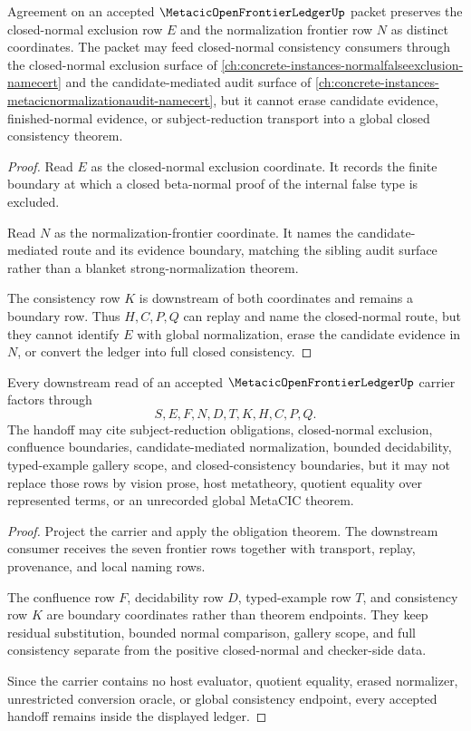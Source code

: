 \begin{theorem}
\label{thm:metacic-open-frontier-ledger-normalization-boundary}
Agreement on an accepted $\MetacicOpenFrontierLedgerUp$ packet preserves the closed-normal exclusion row $E$ and the normalization frontier row $N$ as distinct coordinates. The packet may feed closed-normal consistency consumers through the closed-normal exclusion surface of \autoref{ch:concrete-instances-normalfalseexclusion-namecert} and the candidate-mediated audit surface of \autoref{ch:concrete-instances-metacicnormalizationaudit-namecert}, but it cannot erase candidate evidence, finished-normal evidence, or subject-reduction transport into a global closed consistency theorem.
\end{theorem}
\begin{proof}
Read $E$ as the closed-normal exclusion coordinate. It records the finite boundary at which a closed beta-normal proof of the internal false type is excluded.

Read $N$ as the normalization-frontier coordinate. It names the candidate-mediated route and its evidence boundary, matching the sibling audit surface rather than a blanket strong-normalization theorem.

The consistency row $K$ is downstream of both coordinates and remains a boundary row. Thus $H,C,P,Q$ can replay and name the closed-normal route, but they cannot identify $E$ with global normalization, erase the candidate evidence in $N$, or convert the ledger into full closed consistency.
\end{proof}

\begin{theorem}
\label{thm:metacic-open-frontier-ledger-downstream-handoff}
Every downstream read of an accepted $\MetacicOpenFrontierLedgerUp$ carrier factors through
$$
S,E,F,N,D,T,K,H,C,P,Q.
$$
The handoff may cite subject-reduction obligations, closed-normal exclusion, confluence boundaries, candidate-mediated normalization, bounded decidability, typed-example gallery scope, and closed-consistency boundaries, but it may not replace those rows by vision prose, host metatheory, quotient equality over represented terms, or an unrecorded global MetaCIC theorem.
\end{theorem}
\begin{proof}
Project the carrier and apply the obligation theorem. The downstream consumer receives the seven frontier rows together with transport, replay, provenance, and local naming rows.

The confluence row $F$, decidability row $D$, typed-example row $T$, and consistency row $K$ are boundary coordinates rather than theorem endpoints. They keep residual substitution, bounded normal comparison, gallery scope, and full consistency separate from the positive closed-normal and checker-side data.

Since the carrier contains no host evaluator, quotient equality, erased normalizer, unrestricted conversion oracle, or global consistency endpoint, every accepted handoff remains inside the displayed ledger.
\end{proof}

